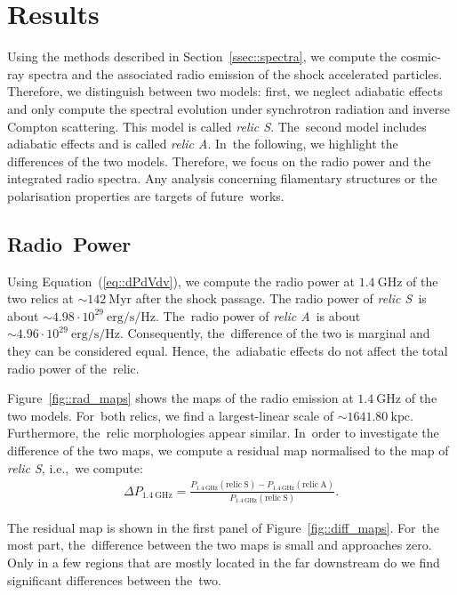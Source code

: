 \documentclass[galaxies,article,accept,moreauthors,pdftex]{mdpi}
\newcommand{\kpc}{\mathrm{kpc}}
\newcommand{\sek}{\mathrm{s}}
\newcommand{\Myr}{\mathrm{Myr}}
\newcommand{\erg}{\mathrm{erg}}
\newcommand{\Hz}{\mathrm{Hz}}
\newcommand{\GHz}{\mathrm{GHz}}
\newcommand{\relicA}{\textit{relic A}}
\newcommand{\relicS}{\textit{relic S}}
\begin{document}
\section{Results}\label{3}




Using the methods described in Section~\ref{ssec::spectra}, we compute the cosmic-ray spectra and the associated radio emission of the shock accelerated particles. Therefore, we distinguish between two models: first, we neglect adiabatic effects and only compute the spectral evolution under synchrotron radiation and inverse Compton scattering. This model is called \relicS. The~second model includes adiabatic effects and is called \relicA. In~the following, we highlight the differences of the two models. Therefore, we focus on the radio power and the integrated radio spectra. Any analysis concerning filamentary structures or the polarisation properties are targets of future~works.

\subsection{Radio~Power}\label{ssec::power}

{{Using Equation~(\ref{eq::dPdVdv}), we compute the radio power at $1.4 \ \GHz$ of the two relics at $\sim 142 \ \Myr$ after the shock passage.}} The radio power of \relicS \ is about $\sim 4.98 \cdot 10^{29} \ \erg/\sek/\Hz$. The~radio power of \relicA \ is about $\sim 4.96 \cdot 10^{29} \ \erg/\sek/\Hz$. Consequently, the~difference of the two is marginal and they can be considered equal. Hence, the~adiabatic effects do not affect the total radio power of the~relic.

Figure~\ref{fig::rad_maps} shows the maps of the radio emission at $1.4 \ \GHz$ of the two models. For~both relics, we find a largest-linear scale of $\sim 1641.80 \ \kpc$. Furthermore, the~relic morphologies appear similar. In~order to investigate the difference of the two maps, we compute a residual map normalised to the map of \relicS, i.e.,~we compute:
\begin{align}
 \Delta P_{1.4 \ \GHz} = \frac{P_{1.4 \ \GHz}(\mathrm{relic \ S})-P_{1.4 \ \GHz}(\mathrm{relic \ A})}{P_{1.4 \ \GHz}(\mathrm{relic \ S})} . \label{eq::res}
\end{align}

The residual map is shown in the first panel of Figure~\ref{fig::diff_maps}. For~the most part, the~difference between the two maps is small and approaches zero. Only in a few regions that are mostly located in the far downstream do we find significant differences between the~two. 
\end{document}
